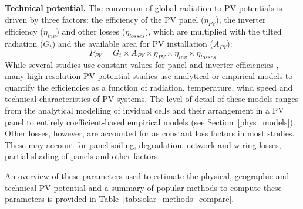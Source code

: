 \textbf{Technical potential.} The conversion of global radiation to PV potentials is driven by three factors: the efficiency of the PV panel ($\eta_{PV}$), the inverter efficiency ($\eta_\mathit{inv}$) and other losses ($\eta_\mathit{losses}$), which are multiplied with the tilted radiation ($G_t$) and the available area for PV installation ($A_{PV}$):
\begin{equation}
    P_{PV} = G_t \times A_{PV} \times \eta_{PV} \times \eta_\mathit{inv} \times \eta_\mathit{losses}
\end{equation}
While several studies use constant values for panel and inverter efficiencies \cite{assouline_quantifying_2017,wegertseder_combining_2016,romero_rodriguez_assessment_2017,ordonez_analysis_2010,hong_development_2017}, many high-resolution PV potential studies use analytical or empirical models to quantify the efficiencies as a function of radiation, temperature, wind speed and technical characteristics of PV systems. The level of detail of these models ranges from the analytical modelling of invidual cells and their arrangement in a PV panel \cite{buffat_scalable_2018} to entirely coefficient-based empirical models \cite{mainzer_assessment_2017} (see Section~\ref{phys_models}). Other losses, however, are accounted for as constant loss factors in most studies. These may account for panel soiling, degradation, network and wiring losses, partial shading of panels and other factors.

An overview of these parameters used to estimate the physical, geographic and technical PV potential and a summary of popular methods to compute these parameters is provided in Table~\ref{tab:solar_methods_compare}.

